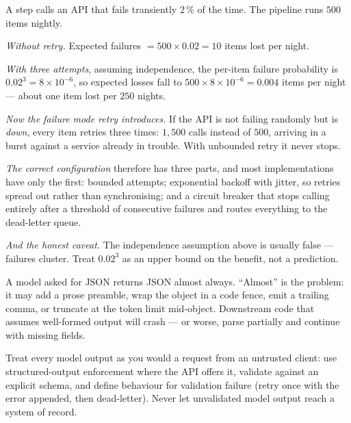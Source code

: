 \begin{workedexample}
A step calls an API that fails transiently $2\,\%$ of the time. The pipeline
runs $500$ items nightly.

\emph{Without retry.} Expected failures $= 500 \times 0.02 = 10$ items lost
per night.

\emph{With three attempts}, assuming independence, the per-item failure
probability is $0.02^3 = 8\times10^{-6}$, so expected losses fall to
$500 \times 8\times10^{-6} = 0.004$ items per night --- about one item lost per
$250$ nights.

\emph{Now the failure mode retry introduces.} If the API is not failing
randomly but is \emph{down}, every item retries three times: $1{,}500$ calls
instead of $500$, arriving in a burst against a service already in trouble.
With unbounded retry it never stops.

\emph{The correct configuration} therefore has three parts, and most
implementations have only the first: bounded attempts; exponential backoff
with jitter, so retries spread out rather than synchronising; and a circuit
breaker that stops calling entirely after a threshold of consecutive failures
and routes everything to the dead-letter queue.

\emph{And the honest caveat.} The independence assumption above is usually
false --- failures cluster. Treat $0.02^3$ as an upper bound on the benefit,
not a prediction.
\end{workedexample}

\begin{cautionbox}
A model asked for JSON returns JSON almost always. ``Almost'' is the problem:
it may add a prose preamble, wrap the object in a code fence, emit a trailing
comma, or truncate at the token limit mid-object. Downstream code that assumes
well-formed output will crash --- or worse, parse partially and continue with
missing fields.

Treat every model output as you would a request from an untrusted client: use
structured-output enforcement where the API offers it, validate against an
explicit schema, and define behaviour for validation failure (retry once with
the error appended, then dead-letter). Never let unvalidated model output
reach a system of record.
\end{cautionbox}


